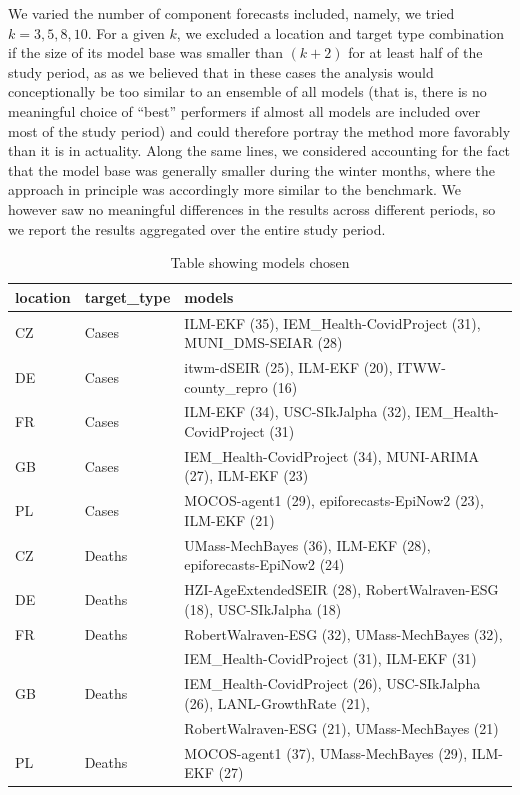 We varied the number of component forecasts included, namely, we tried $k = 3,5,8,10$. For a given $k$, we excluded a location and target type combination if the size of its model base was smaller than $(k+2)$ for at least half of the study period, as as we believed that in these cases the analysis would conceptionally be too similar to an ensemble of all models (that is, there is no meaningful choice of ``best'' performers if almost all models are included over most of the study period) and could therefore portray the method more favorably than it is in actuality. Along the same lines, we considered accounting for the fact that the model base was generally smaller during the winter months, where the approach in principle was accordingly more similar to the benchmark. We however saw no meaningful differences in the results across different periods, so we report the results aggregated over the entire study period.\\
\begin{table}[t]
\centering
\begin{tabular}{lll}
\hline
location & target\_type & models\\
\hline
CZ & Cases & ILM-EKF (35), IEM\_Health-CovidProject (31), MUNI\_DMS-SEIAR (28)\\[0.1em]
DE & Cases & itwm-dSEIR (25), ILM-EKF (20), ITWW-county\_repro (16)\\[0.1em]
FR & Cases & ILM-EKF (34), USC-SIkJalpha (32), IEM\_Health-CovidProject (31)\\[0.1em]
GB & Cases & IEM\_Health-CovidProject (34), MUNI-ARIMA (27), ILM-EKF (23)\\[0.1em]
PL & Cases & MOCOS-agent1 (29), epiforecasts-EpiNow2 (23), ILM-EKF (21)\\[0.8em]
CZ & Deaths & UMass-MechBayes (36), ILM-EKF (28), epiforecasts-EpiNow2 (24)\\[0.1em]
DE & Deaths & HZI-AgeExtendedSEIR (28), RobertWalraven-ESG (18), USC-SIkJalpha (18)\\[0.1em]
FR & Deaths & RobertWalraven-ESG (32), UMass-MechBayes (32),\\
& & IEM\_Health-CovidProject (31), ILM-EKF (31)\\[0.1em]
GB & Deaths & IEM\_Health-CovidProject (26), USC-SIkJalpha (26), LANL-GrowthRate (21), \\
& & RobertWalraven-ESG (21), UMass-MechBayes (21)\\[0.1em]
PL & Deaths & MOCOS-agent1 (37), UMass-MechBayes (29), ILM-EKF (27)\\
\hline
\end{tabular}
\caption{Table showing models chosen}
\label{tab:bp_chosenmods}
\end{table}
